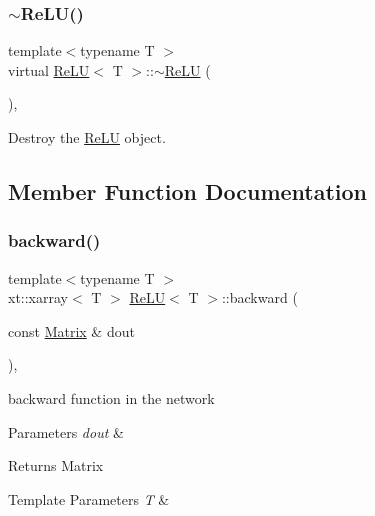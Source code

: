 \subsubsection{\texorpdfstring{$\sim$ReLU()}{~ReLU()}}
{\footnotesize\ttfamily template$<$typename T $>$ \\
virtual \mbox{\hyperlink{class_re_l_u}{Re\+LU}}$<$ T $>$\+::$\sim$\mbox{\hyperlink{class_re_l_u}{Re\+LU}} (\begin{DoxyParamCaption}{ }\end{DoxyParamCaption})\hspace{0.3cm}{\ttfamily [virtual]}, {\ttfamily [default]}}



Destroy the \mbox{\hyperlink{class_re_l_u}{Re\+LU}} object. 



\subsection{Member Function Documentation}
\mbox{\label{class_re_l_u_aa634f43909614b979d84f5d4e5480bb4}} 
\subsubsection{\texorpdfstring{backward()}{backward()}}
{\footnotesize\ttfamily template$<$typename T $>$ \\
xt\+::xarray$<$ T $>$ \mbox{\hyperlink{class_re_l_u}{Re\+LU}}$<$ T $>$\+::backward (\begin{DoxyParamCaption}\item[{const \mbox{\hyperlink{class_re_l_u_a3d1448f06335a4ab7227ec31a43a410f}{Matrix}} \&}]{dout }\end{DoxyParamCaption})\hspace{0.3cm}{\ttfamily [override]}, {\ttfamily [virtual]}}



backward function in the network 


\begin{DoxyParams}{Parameters}
{\em dout} & \\
\hline
\end{DoxyParams}
\begin{DoxyReturn}{Returns}
Matrix
\end{DoxyReturn}

\begin{DoxyTemplParams}{Template Parameters}
{\em T} & \\
\hline
\end{DoxyTemplParams}

